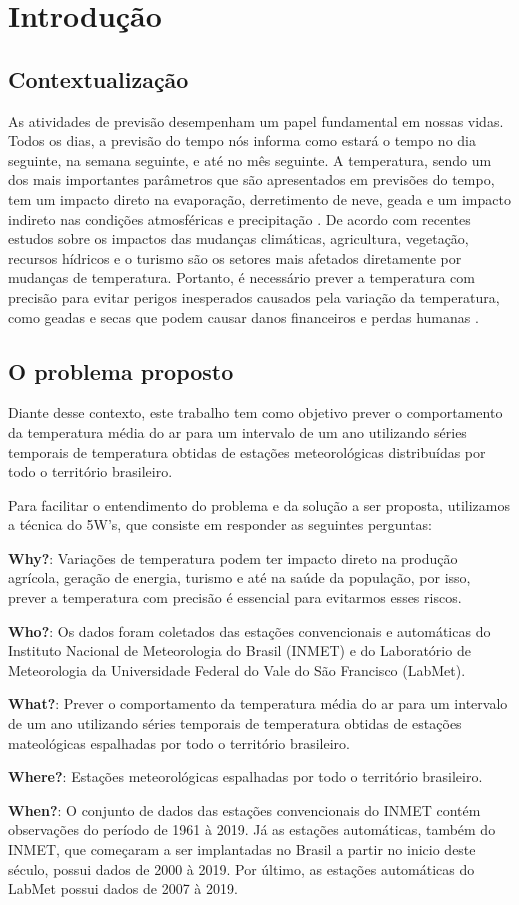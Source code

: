 \chapter{Introdução}

\section{Contextualização}
As atividades de previsão desempenham um papel fundamental em nossas vidas. Todos os dias, a previsão do tempo nós informa como estará o tempo no dia seguinte, na semana seguinte, e até no mês seguinte. A temperatura, sendo um dos mais importantes parâmetros que são apresentados em previsões do tempo, tem um impacto direto na evaporação, derretimento de neve, geada e um impacto indireto nas condições atmosféricas e precipitação \cite{hansen2006global}. De acordo com recentes estudos sobre os impactos das mudanças climáticas, agricultura, vegetação, recursos hídricos e o turismo são os setores mais afetados diretamente por mudanças de temperatura. Portanto, é necessário prever a temperatura com precisão para evitar perigos inesperados causados pela variação da temperatura, como geadas e secas que podem causar danos financeiros e perdas humanas \cite{kaymaz2005hazards}.

\section{O problema proposto}
Diante desse contexto, este trabalho tem como objetivo prever o comportamento da temperatura média do ar para um intervalo de um ano utilizando séries temporais de temperatura obtidas de estações meteorológicas distribuídas por todo o território brasileiro.

Para facilitar o entendimento do problema e da solução a ser proposta, utilizamos a técnica do 5W's, que consiste em responder as seguintes perguntas:

\textbf{Why?}: Variações de temperatura podem ter impacto direto na produção agrícola, geração de energia, turismo e até na saúde da população, por isso, prever a temperatura com precisão é essencial para evitarmos esses riscos.

\textbf{Who?}: Os dados foram coletados das estações convencionais e automáticas do Instituto Nacional de Meteorologia do Brasil (INMET) e do Laboratório de Meteorologia da Universidade Federal do Vale do São Francisco (LabMet).

\textbf{What?}: Prever o comportamento da temperatura média do ar para um intervalo de um ano utilizando séries temporais de temperatura obtidas de estações mateológicas espalhadas por todo o território brasileiro.

\textbf{Where?}: Estações meteorológicas espalhadas por todo o território brasileiro.  

\textbf{When?}: O conjunto de dados das estações convencionais do INMET contém observações do período de 1961 à 2019. Já as estações automáticas, também do INMET, que começaram a ser implantadas no Brasil a partir no inicio deste século, possui dados de 2000 à 2019. Por último, as estações automáticas do LabMet possui dados de 2007 à 2019. 